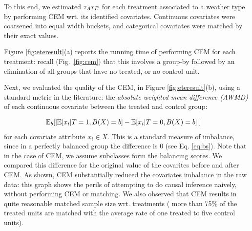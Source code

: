 To this end, we estimated ${\tau_{ATE}}$  for each treatment associated to a weather type by performing CEM wrt. its identified covariates.  Continuous covariates were coarsened into equal width buckets, and categorical covariates were
matched by their exact values.

Figure \ref{fig:eteresult}(a) reports the running time of performing
CEM for each treatment: recall (Fig.~\ref{fig:cem}) that this involves
a group-by followed by an elimination of all groups that have no
treated, or no control unit.
 Next, we evaluated the quality of the CEM, in Figure
\ref{fig:eteresult}(b), using a standard metric in the literature: the
{\em absolute weighted mean difference (AWMD)} of each continuous
covariate between the treated and control group:

{
\begin{align}
& \mathbb{E}_b[|\mathbb{E}[x_i | T=1, B(X)=b]-\mathbb{E}[x_i | T=0, B(X)=b]|] \label{eq:awmd}
\end{align}
}\noindent for each covariate attribute $x_i \in X$.  This is
a standard measure of imbalance, since in a perfectly balanced group
the difference is 0 (see Eq. \ref{eq:bs}). Note that in the case of CEM, we assume subclasses form the balancing scores.  We compared this
difference for the original value of the covarites  before and after CEM.  As shown, CEM substantially reduced
the covariates imbalance in the raw data: this graph shows the perils
of attempting to do causal inference naively, without performing CEM
or matching.  We also observed that CEM results in quite reasonable
matched sample size wrt. treatments ( more than 75\% of the treated
units are matched with the average rate of one treated to five control
units).





 


